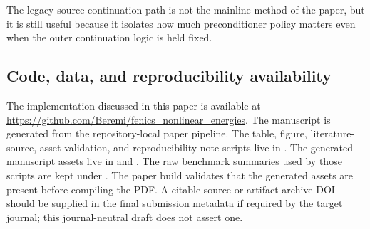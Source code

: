 The legacy source-continuation path is not the mainline method of the paper,
but it is still useful because it isolates how much preconditioner policy
matters even when the outer continuation logic is held fixed.

\begin{table}[H]
  \centering
  
  \caption{Source continuation with the fixed PMG-shell smoother policy at 8
  and 32 ranks. This is supporting solver evidence only; it is not part of the
  paper's main maintained production story.}
  \label{tab:source-cont}
\end{table}

\subsection{Code, data, and reproducibility availability}

The implementation discussed in this paper is available at
\url{https://github.com/Beremi/fenics_nonlinear_energies}. The manuscript is
generated from the repository-local paper pipeline. The table, figure,
literature-source, asset-validation, and reproducibility-note scripts live in
. The generated manuscript assets live in
 and . The raw
benchmark summaries used by those scripts are kept under
. The paper build validates that the generated
assets are present before compiling the PDF. A citable source or artifact
archive DOI should be supplied in the final submission metadata if required by
the target journal; this journal-neutral draft does not assert one.
